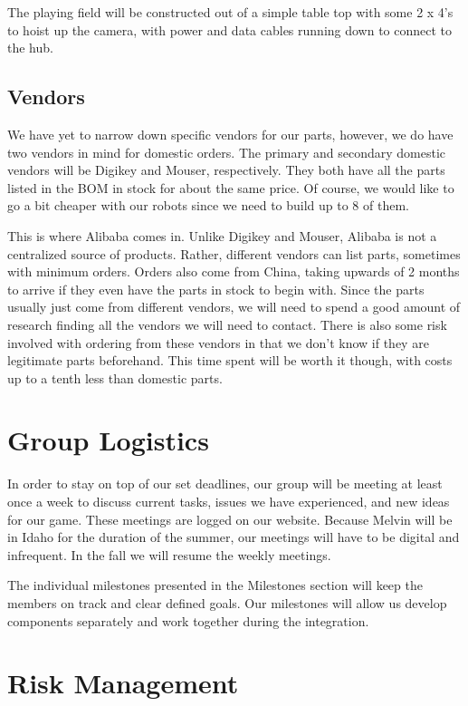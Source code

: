 \documentclass[11pt]{ieeeconf}
\begin{document}
The playing field will be constructed out of a simple table top with some 2 x 4's to hoist up the camera, with power and data cables running down to connect to the hub.

\subsection{Vendors}

We have yet to narrow down specific vendors for our parts, however, we do have two vendors in mind for domestic orders. The primary and secondary domestic vendors will be Digikey and Mouser, respectively. They both have all the parts listed in the BOM in stock for about the same price. Of course, we would like to go a bit cheaper with our robots since we need to build up to 8 of them.

This is where Alibaba comes in. Unlike Digikey and Mouser, Alibaba is not a centralized source of products. Rather, different vendors can list parts, sometimes with minimum orders. Orders also come from China, taking upwards of 2 months to arrive if they even have the parts in stock to begin with. Since the parts usually just come from different vendors, we will need to spend a good amount of research finding all the vendors we will need to contact. There is also some risk involved with ordering from these vendors in that we don’t know if they are legitimate parts beforehand. This time spent will be worth it though, with costs up to a tenth less than domestic parts.


\section{Group Logistics}
In order to stay on top of our set deadlines, our group will be meeting at least once a week to discuss current tasks, issues we have experienced, and new ideas for our game. These meetings are logged on our website. Because Melvin will be in Idaho for the duration of the summer, our meetings will have to be digital and infrequent. In the fall we will resume the weekly meetings.

The individual milestones presented in the Milestones section will keep the members on track and clear defined goals. Our milestones will allow us develop components separately and work together during the integration. 

\section{Risk Management}
\end{document}
